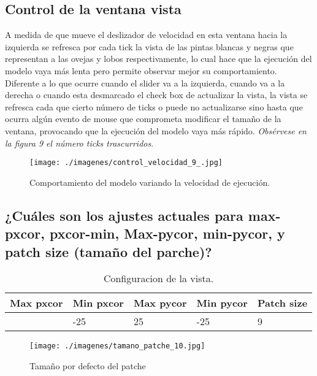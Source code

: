 \documentclass[12pt,letterpaper]{article}
\begin{document}
\subsection{Control de la  ventana vista}
A medida de que mueve el deslizador de velocidad en esta ventana hacia la izquierda se refresca por cada tick la vista de las pintas blancas y negras que representan a las ovejas y lobos respectivamente, lo cual hace que la ejecución  del modelo vaya más lenta pero permite observar mejor su comportamiento. Diferente a lo que ocurre cuando el slider va a la izquierda, cuando va a la derecha o cuando esta desmarcado el check box de actualizar la vista, la vista se refresca cada que cierto número de ticks o puede no actualizarse sino hasta que ocurra algún evento de mouse que comprometa modificar el tamaño de la ventana, provocando que la ejecución del modelo vaya más rápido. \textit{ Obsérvese en la figura 9 el número ticks trascurridos}.
\begin{figure}[h!]
\begin{floatrow}
\centering
\caption{Comportamiento del modelo variando la velocidad de ejecución.}
\texttt{[image: ./imagenes/control\_velocidad\_9\_.jpg]}
\label{fig: vista}
\end{floatrow}
\end{figure}

\subsection{¿Cuáles son los ajustes actuales para max-pxcor, pxcor-min, Max-pycor, min-pycor, y  patch size  (tamaño del parche)?}

\begin{longtable}{C{2cm}C{2cm}C{2cm}C{2cm}C{2cm}}
\caption{Configuracion de la vista.}
\label{tab:indicadorespH}\\
\hline
\bfseries{Max pxcor} & \bfseries{Min pxcor} & \bfseries{Max pycor} & \bfseries{Min pycor} & \bfseries{Patch size}\\
\hline
\endfirsthead
\hline
\endhead
\endfoot
\hline
\endlastfoot

 &-25 &25 &-25 &9  \\
\end{longtable}

\begin{figure}[h!]
\begin{floatrow}
\centering
\caption{Tamaño por defecto del patche}
\texttt{[image: ./imagenes/tamano\_patche\_10.jpg]}
\label{fig:tubes}
\end{floatrow}
\end{figure}
\vspace{5cm}
\end{document}
